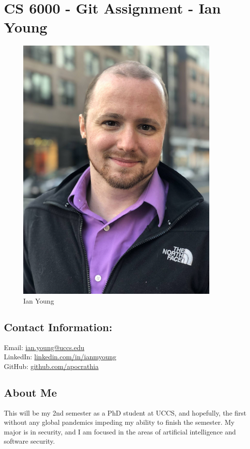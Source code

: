 \section{CS 6000 - Git Assignment - Ian Young}

\begin{figure}
	\centering
	\includegraphics[width=0.4\linewidth]{Young.png}
	\caption{Ian Young}
\end{figure}

\subsection{Contact Information:}
Email: \href{mailto:ian.young@uccs.edu}{ian.young@uccs.edu} \\
LinkedIn: \href{https://linkedin.com/in/ianmyoung}{linkedin.com/in/ianmyoung} \\
GitHub: \href{https://github.com/apocrathia}{github.com/apocrathia}

\subsection{About Me}
	
This will be my 2nd semester as a PhD student at UCCS, and hopefully, the first without any global pandemics impeding my ability to finish the semester. My major is in security, and I am focused in the areas of artificial intelligence and software security.

\medskip

